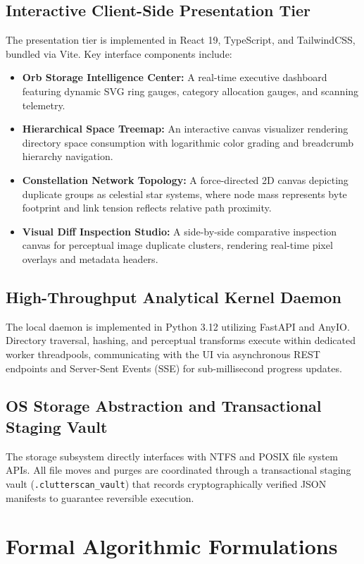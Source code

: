 \documentclass[journal,compsoc,10pt,twocolumn]{IEEEtran}
\begin{document}
\subsection{Interactive Client-Side Presentation Tier}
The presentation tier is implemented in React 19, TypeScript, and TailwindCSS, bundled via Vite. Key interface components include:
\begin{itemize}
    \item \textbf{Orb Storage Intelligence Center:} A real-time executive dashboard featuring dynamic SVG ring gauges, category allocation gauges, and scanning telemetry.
    \item \textbf{Hierarchical Space Treemap:} An interactive canvas visualizer rendering directory space consumption with logarithmic color grading and breadcrumb hierarchy navigation.
    \item \textbf{Constellation Network Topology:} A force-directed 2D canvas depicting duplicate groups as celestial star systems, where node mass represents byte footprint and link tension reflects relative path proximity.
    \item \textbf{Visual Diff Inspection Studio:} A side-by-side comparative inspection canvas for perceptual image duplicate clusters, rendering real-time pixel overlays and metadata headers.
\end{itemize}

\subsection{High-Throughput Analytical Kernel Daemon}
The local daemon is implemented in Python 3.12 utilizing FastAPI and AnyIO. Directory traversal, hashing, and perceptual transforms execute within dedicated worker threadpools, communicating with the UI via asynchronous REST endpoints and Server-Sent Events (SSE) for sub-millisecond progress updates.

\subsection{OS Storage Abstraction and Transactional Staging Vault}
The storage subsystem directly interfaces with NTFS and POSIX file system APIs. All file moves and purges are coordinated through a transactional staging vault (\texttt{.clutterscan\_vault}) that records cryptographically verified JSON manifests to guarantee reversible execution.

\section{Formal Algorithmic Formulations}
\label{sec:algorithms}
\end{document}

